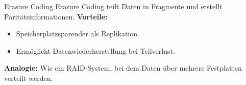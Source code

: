 \documentclass{beamer}
\begin{document}
\begin{frame}{Erasure Coding}
    Erasure Coding teilt Daten in Fragmente und erstellt Paritätsinformationen. \newline
    \textbf{Vorteile:}
    \begin{itemize}
        \item Speicherplatzsparender als Replikation.
        \item Ermöglicht Datenwiederherstellung bei Teilverlust.
    \end{itemize}
    \textbf{Analogie:} Wie ein RAID-System, bei dem Daten über mehrere Festplatten verteilt werden.
\end{frame}
\end{document}
